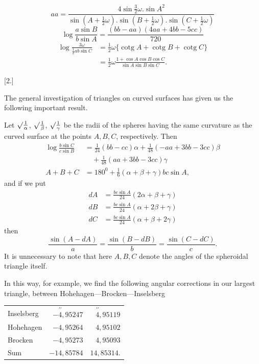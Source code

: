 %
\[
aa=\frac{4\sin\frac32\omega.\sin A^2}{\sin(A+\frac12\omega).\sin(B+\frac12\omega).\sin(C+\frac12\omega)}
\]
\[
\log\frac{a\sin B}{b\sin A}=\frac{(bb-aa)(4aa+4bb-5cc)}{720}
\]
\[
\begin{aligned}
\log\frac{3\omega}{\frac12 ab\sin C}&=\tfrac12\omega\{\operatorname{cotg}A+\operatorname{cotg}B+\operatorname{cotg}C\}\\
&=\tfrac12\omega\frac{1+\cos A\cos B\cos C}{\sin A\sin B\sin C}.
\end{aligned}
\]
\par{}\begin{center}[2.]\end{center}
\noindent\hspace*{1.2em}The general investigation of triangles on curved surfaces has given us the following important result.

Let $\mathord{\surd}\frac1\alpha$, $\mathord{\surd}\frac1\beta$, $\mathord{\surd}\frac1\gamma$ be the radii of the spheres having the same curvature as the curved surface at the points $A,B,C$, respectively. Then
\[
\begin{aligned}
\log\frac{b\sin C}{c\sin B}&=\tfrac1{24}(bb-cc)\alpha+\tfrac1{48}(-aa+3bb-3cc)\beta\\
&\quad+\tfrac1{48}(aa+3bb-3cc)\gamma\\
A+B+C&=180^0+\tfrac16(\alpha+\beta+\gamma)bc\sin A,
\end{aligned}
\]
\noindent and if we put
\[
\begin{aligned}
dA&=\frac{bc\sin A}{24}(2\alpha+\beta+\gamma)\\
dB&=\frac{bc\sin A}{24}(\alpha+2\beta+\gamma)\\
dC&=\frac{bc\sin A}{24}(\alpha+\beta+2\gamma)
\end{aligned}
\]
\noindent then
\[
\frac{\sin(A-dA)}a=\frac{\sin(B-dB)}b=\frac{\sin(C-dC)}c.
\]
\indent It is unnecessary to note that here $A,B,C$ denote the angles of the spheroidal triangle itself.

In this way, for example, we find the following angular corrections in our largest triangle, between Hohe\-hagen---Brocken---Inselsberg
\begin{center}\begin{tabular}{lrr}
Inselsberg & $-\overset{\prime\prime}{4}{,}95247$ & $\overset{\prime\prime}{4}{,}95119$\\
Hohehagen & $-4{,}95264$ & $4{,}95102$\\
Brocken & $-4{,}95273$ & $4{,}95093$\\
Sum & $-14{,}85784$ & $14{,}85314.$
\end{tabular}\end{center}
